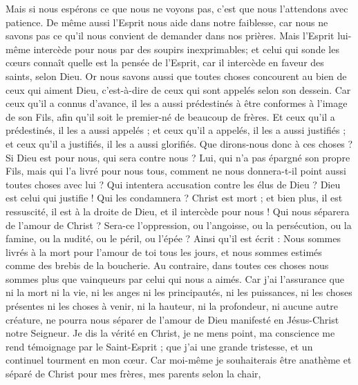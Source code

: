 \begin{multicols}{2}
Mais si nous espérons ce que nous ne voyons pas, c'est que nous l'attendons avec patience.
De même aussi l'Esprit nous aide dans notre faiblesse, car nous ne savons pas ce qu'il nous convient de demander dans nos prières. Mais l'Esprit lui-même intercède pour nous par des soupirs inexprimables;
et celui qui sonde les cœurs connaît quelle est la pensée de l'Esprit, car il intercède en faveur des saints, selon Dieu.
Or nous savons aussi que toutes choses concourent au bien de ceux qui aiment Dieu, c'est-à-dire de ceux qui sont appelés selon son dessein.
Car ceux qu'il a connus d'avance, il les a aussi prédestinés à être conformes à l'image de son Fils, afin qu'il soit le premier-né de beaucoup de frères.
Et ceux qu'il a prédestinés, il les a aussi appelés ; et ceux qu'il a appelés, il les a aussi justifiés ; et ceux qu'il a justifiés, il les a aussi glorifiés.
Que dirons-nous donc à ces choses ? Si Dieu est pour nous, qui sera contre nous ?
Lui, qui n'a pas épargné son propre Fils, mais qui l'a livré pour nous tous, comment ne nous donnera-t-il point aussi toutes choses avec lui ?
Qui intentera accusation contre les élus de Dieu ? Dieu est celui qui justifie !
Qui les condamnera ? Christ est mort ; et bien plus, il est ressuscité, il est à la droite de Dieu, et il intercède pour nous !
Qui nous séparera de l'amour de Christ ? Sera-ce l'oppression, ou l'angoisse, ou la persécution, ou la famine, ou la nudité, ou le péril, ou l'épée ?
Ainsi qu'il est écrit : Nous sommes livrés à la mort pour l'amour de toi tous les jours, et nous sommes estimés comme des brebis de la boucherie.
Au contraire, dans toutes ces choses nous sommes plus que vainqueurs par celui qui nous a aimés.
Car j'ai l'assurance que ni la mort ni la vie, ni les anges ni les principautés, ni les puissances, ni les choses présentes ni les choses à venir,
ni la hauteur, ni la profondeur, ni aucune autre créature, ne pourra nous séparer de l'amour de Dieu manifesté en Jésus-Christ notre Seigneur.
\VerseOne{}Je dis la vérité en Christ, je ne mens point, ma conscience me rend témoignage par le Saint-Esprit ;
que j'ai une grande tristesse, et un continuel tourment en mon cœur.
Car moi-même je souhaiterais être anathème et séparé de Christ pour mes frères, mes parents selon la chair,

\end{multicols}
